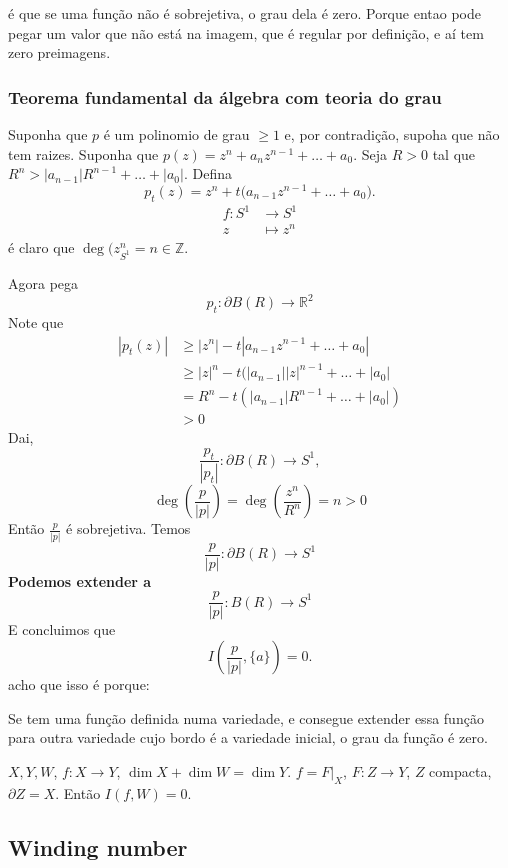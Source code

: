\begin{remark}\leavevmode
é que se uma função não é sobrejetiva, o grau dela é zero. Porque entao pode pegar um valor que não está na imagem, que é regular por definição, e aí tem zero preimagens.
\end{remark}

\subsubsection{Teorema fundamental da álgebra com teoria do grau}

Suponha que \(p\) é um polinomio de grau \(\geq 1\) e, por contradição, supoha que não tem raizes. Suponha que \(p(z)=z^n+a_n z^{n-1}+\ldots+a_0\). Seja \(R>0\) tal que \(R^n> |a_{n-1}|R^{n-1}+ \ldots + |a_0|\). Defina
 \[p_t(z)=z^n+t\Big(a_{n-1}z^{n-1}+\ldots+a_0 \Big).\]
 \begin{align*}
 	f: S^1 &\longrightarrow S^1 \\
 	z &\longmapsto z^n
 \end{align*}
 é claro que \(\operatorname{deg}(z^n_{S^1}=n \in \mathbb{Z}\).

 Agora pega
 \[p_t: \partial B(R) \to \mathbb{R}^2\]
Note que
\begin{align*}
|p_t(z)|&\geq |z^n|-t|a_{n-1}z^{n-1}+\ldots+a_0|\\
&\geq |z|^n-t(|a_{n-1}||z|^{n-1}+\ldots+|a_0|\\
&=R^n-t(|a_{n-1}|R^{n-1}+\ldots+|a_0|)\\
&>0
\end{align*}
Dai,
\[\frac{p_t}{|p_t|}:\partial B (R) \to S^1,\]
\[\operatorname{deg}\left(\frac{p}{|p|}\right) =\operatorname{deg} \left(\frac{z^n}{R^n}\right) =n>0\]
Então \(\frac{p}{|p|}\) é sobrejetiva. Temos
\[\frac{ p}{|p|}: \partial  B(R) \to S^1\]
\textbf{Podemos extender a} 
\[\frac{p}{|p|}: B (R)\to S^1\]
E concluimos que
 \[I\left(\frac{p}{|p|},\{a\}\right) =0.\]
acho que isso é porque:
\begin{prop}\leavevmode
Se tem uma função definida numa variedade, e consegue extender essa função para outra variedade cujo bordo é a variedade inicial, o grau da função é zero.

\(X,Y,W\), \(f:X \to Y\), \(\dim X +\dim W=\dim Y\). \(f=F|_{X}\), \(F: Z \to Y\), \(Z\) compacta, \(\partial Z=X\). Então \(I(f,W)=0\).
\end{prop}

\subsection{Winding number}

